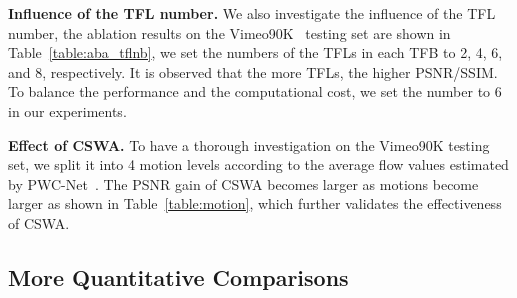 \documentclass[10pt,twocolumn,letterpaper]{article}
\begin{document}
	
	\noindent\textbf{Influence of the TFL number.} We also investigate the influence of the TFL number, the ablation results on the Vimeo90K~\cite{vimeo90k} testing set are shown in Table~\ref{table:aba_tflnb}, we set the numbers of the TFLs in each TFB to 2, 4, 6, and 8, respectively. It is observed that the more TFLs, the higher PSNR/SSIM. To balance the performance and the computational cost, we set the number to 6 in our experiments.
	
	\noindent\textbf{Effect of CSWA.} To have a thorough investigation on the Vimeo90K testing set, we split it into 4 motion levels according to the average flow values estimated by PWC-Net~\cite{pwcnet}. The PSNR gain of CSWA becomes larger as motions become larger as shown in Table~\ref{table:motion}, which further validates the effectiveness of CSWA. 
	
	\begin{table}[h]
		\setlength{\belowcaptionskip}{0pt}
		\centering
		\label{table:motion}
\end{table}
	
	\subsection{More Quantitative Comparisons}
	
	\begin{table}[h]
		\setlength{\belowcaptionskip}{0pt}
		\centering
		\footnotesize
\caption{More quantitative comparisons. The running time is tested on images with  resolution on an NVIDIA TITAN V GPU.}
		\label{table:runtime_comparison}
\end{table}
	
\end{document}
